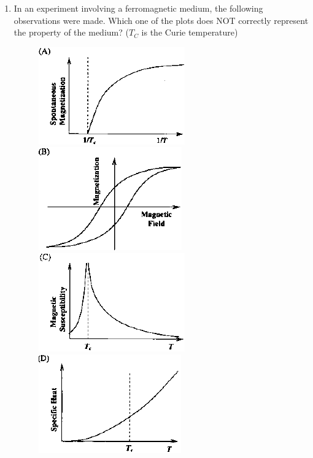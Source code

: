 \documentclass[journal,12pt,onecolumn]{IEEEtran}
\theoremstyle{remark}
\begin{document}
\begin{enumerate}
\item In an experiment involving a ferromagnetic medium, the following observations were made. Which one of the plots does NOT correctly represent the property of the medium? ($T_C$ is the Curie temperature)\hfill{}
\begin{figure}[H]
\begin{multicols}{2}
	\centering
	\caption*{} \label{9a} \includegraphics[width=0.45\columnwidth]{figs/9a.png}
	\caption*{} \label{9b} \includegraphics[width=0.45\columnwidth]{figs/9b.png}
	\caption*{} \label{9c} \includegraphics[width=0.45\columnwidth]{figs/9c.png}
	\caption*{} \label{9d} \includegraphics[width=0.45\columnwidth]{figs/9d.png}
	\end{multicols}
\end{figure}


\end{enumerate}
\end{document}
